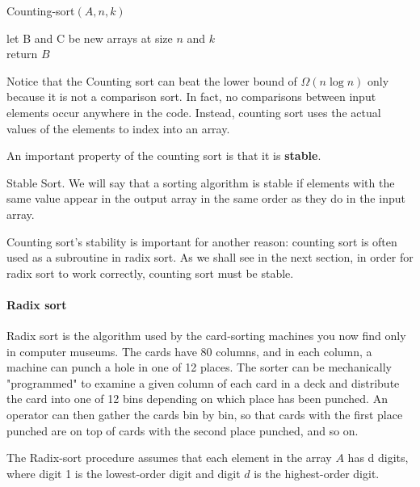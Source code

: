 \begin{algbox}{Counting-sort$(A, n, k)$}
  \begin{algorithm}[H]
  	let B and C be new arrays at size $n$ and $k$ \\ 
	  return $B$
  \end{algorithm}
\end{algbox}

Notice that the Counting sort can beat the lower bound of $\Omega\left(n \log n\right)$ only because it is not a comparison sort. In fact, no comparisons between input elements occur anywhere in the code. Instead, counting sort uses the actual values of the elements to index into an array.

An important property of the counting sort is that it is \textbf{stable}.

\begin{defbox}{Stable Sort.}
 We will say that a sorting algorithm is stable if elements with the same value appear in the output array in the same order as they do in the input array. \end{defbox}

Counting sort's stability is important for another reason: counting sort is often used as a subroutine in radix sort. As we shall see in the next section, in order for radix sort to work correctly, counting sort must be stable.

\paragraph{Radix sort}
Radix sort is the algorithm used by the card-sorting machines you now find only in computer museums. The cards have 80 columns, and in each column, a machine can punch a hole in one of 12 places. The sorter can be mechanically "programmed" to examine a given column of each card in a deck and distribute the card into one of 12 bins depending on which place has been punched. An operator can then gather the cards bin by bin, so that cards with the first place punched are on top of cards with the second place punched, and so on.

The Radix-sort procedure assumes that each element in the array $A$ has d digits, where digit 1 is the lowest-order digit and digit $d$ is the highest-order digit.


